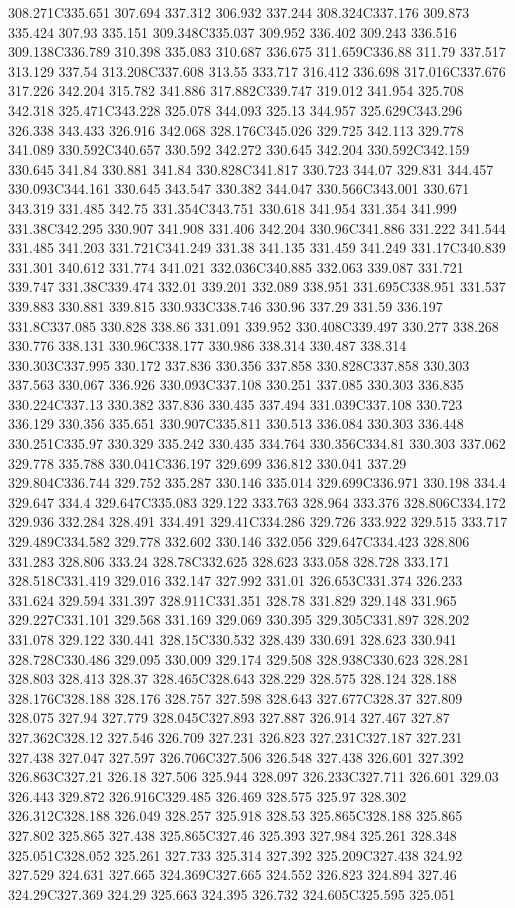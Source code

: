 308.271C335.651 307.694 337.312 306.932 337.244 308.324C337.176 309.873 335.424 307.93 335.151 309.348C335.037 309.952 336.402 309.243 336.516 309.138C336.789 310.398 335.083 310.687 336.675 311.659C336.88 311.79 337.517 313.129 337.54 313.208C337.608 313.55 333.717 316.412 336.698 317.016C337.676 317.226 342.204 315.782 341.886 317.882C339.747 319.012 341.954 325.708 342.318 325.471C343.228 325.078 344.093 325.13 344.957 325.629C343.296 326.338 343.433 326.916 342.068 328.176C345.026 329.725 342.113 329.778 341.089 330.592C340.657 330.592 342.272 330.645 342.204 330.592C342.159 330.645 341.84 330.881 341.84 330.828C341.817 330.723 344.07 329.831 344.457 330.093C344.161 330.645 343.547 330.382 344.047 330.566C343.001 330.671 343.319 331.485 342.75 331.354C343.751 330.618 341.954 331.354 341.999 331.38C342.295 330.907 341.908 331.406 342.204 330.96C341.886 331.222 341.544 331.485 341.203 331.721C341.249 331.38 341.135 331.459 341.249 331.17C340.839 331.301 340.612 331.774 341.021 332.036C340.885 332.063 339.087 331.721 339.747 331.38C339.474 332.01 339.201 332.089 338.951 331.695C338.951 331.537 339.883 330.881 339.815 330.933C338.746 330.96 337.29 331.59 336.197 331.8C337.085 330.828 338.86 331.091 339.952 330.408C339.497 330.277 338.268 330.776 338.131 330.96C338.177 330.986 338.314 330.487 338.314 330.303C337.995 330.172 337.836 330.356 337.858 330.828C337.858 330.303 337.563 330.067 336.926 330.093C337.108 330.251 337.085 330.303 336.835 330.224C337.13 330.382 337.836 330.435 337.494 331.039C337.108 330.723 336.129 330.356 335.651 330.907C335.811 330.513 336.084 330.303 336.448 330.251C335.97 330.329 335.242 330.435 334.764 330.356C334.81 330.303 337.062 329.778 335.788 330.041C336.197 329.699 336.812 330.041 337.29 329.804C336.744 329.752 335.287 330.146 335.014 329.699C336.971 330.198 334.4 329.647 334.4 329.647C335.083 329.122 333.763 328.964 333.376 328.806C334.172 329.936 332.284 328.491 334.491 329.41C334.286 329.726 333.922 329.515 333.717 329.489C334.582 329.778 332.602 330.146 332.056 329.647C334.423 328.806 331.283 328.806 333.24 328.78C332.625 328.623 333.058 328.728 333.171 328.518C331.419 329.016 332.147 327.992 331.01 326.653C331.374 326.233 331.624 329.594 331.397 328.911C331.351 328.78 331.829 329.148 331.965 329.227C331.101 329.568 331.169 329.069 330.395 329.305C331.897 328.202 331.078 329.122 330.441 328.15C330.532 328.439 330.691 328.623 330.941 328.728C330.486 329.095 330.009 329.174 329.508 328.938C330.623 328.281 328.803 328.413 328.37 328.465C328.643 328.229 328.575 328.124 328.188 328.176C328.188 328.176 328.757 327.598 328.643 327.677C328.37 327.809 328.075 327.94 327.779 328.045C327.893 327.887 326.914 327.467 327.87 327.362C328.12 327.546 326.709 327.231 326.823 327.231C327.187 327.231 327.438 327.047 327.597 326.706C327.506 326.548 327.438 326.601 327.392 326.863C327.21 326.18 327.506 325.944 328.097 326.233C327.711 326.601 329.03 326.443 329.872 326.916C329.485 326.469 328.575 325.97 328.302 326.312C328.188 326.049 328.257 325.918 328.53 325.865C328.188 325.865 327.802 325.865 327.438 325.865C327.46 325.393 327.984 325.261 328.348 325.051C328.052 325.261 327.733 325.314 327.392 325.209C327.438 324.92 327.529 324.631 327.665 324.369C327.665 324.552 326.823 324.894 327.46 324.29C327.369 324.29 325.663 324.395 326.732 324.605C325.595 325.051 